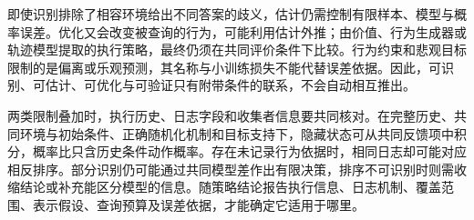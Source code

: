 即使识别排除了相容环境给出不同答案的歧义，估计仍需控制有限样本、模型与概率误差。优化又会改变被查询的行为，可能利用估计外推；由价值、行为生成器或轨迹模型提取的执行策略，最终仍须在共同评价条件下比较。行为约束和悲观目标限制的是偏离或乐观预测，其名称与小训练损失不能代替误差依据。因此，可识别、可估计、可优化与可验证只有附带条件的联系，不会自动相互推出。

两类限制叠加时，执行历史、日志字段和收集者信息要共同核对。在完整历史、共同环境与初始条件、正确随机化机制和目标支持下，隐藏状态可从共同反馈项中积分，概率比只含历史条件动作概率。存在未记录行为依据时，相同日志却可能对应相反排序。部分识别仍可能通过共同模型差作出有限决策，排序不可识别时则需收缩结论或补充能区分模型的信息。随策略结论报告执行信息、日志机制、覆盖范围、表示假设、查询预算及误差依据，才能确定它适用于哪里。
